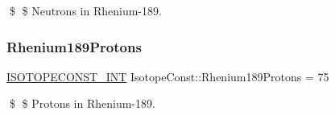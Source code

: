 \$ \$ Neutrons in Rhenium-\/189. \mbox{\label{group___isotope_const-_rhenium-_re189_ga7efff46c29b9351935cabd1d6ee73e88}} 
\subsubsection{\texorpdfstring{Rhenium189\+Protons}{Rhenium189Protons}}
{\footnotesize\ttfamily \mbox{\hyperlink{group___isotope_const-_macros_ga5f18360b3e99483a35c32d789e62621c}{I\+S\+O\+T\+O\+P\+E\+C\+O\+N\+S\+T\+\_\+\+I\+NT}} Isotope\+Const\+::\+Rhenium189\+Protons = 75}

\$ \$ Protons in Rhenium-\/189. 